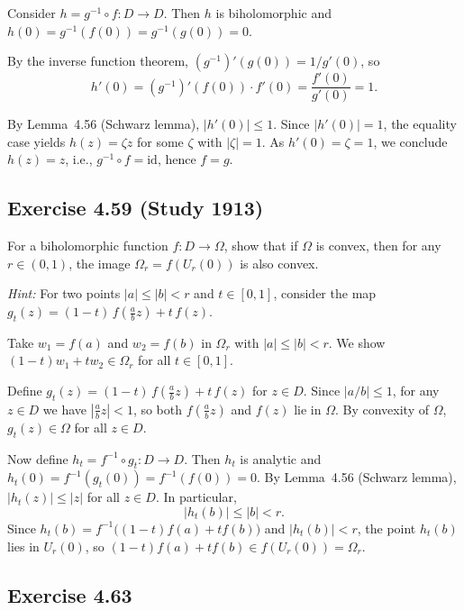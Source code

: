 \documentclass{article}
\begin{document}
\begin{solution}
  Consider $h = g^{-1} \circ f : D \to D$. Then $h$ is biholomorphic
  and $h(0) = g^{-1}(f(0)) = g^{-1}(g(0)) = 0$.

  By the inverse function theorem, $(g^{-1})'(g(0)) = 1/g'(0)$, so
  \[
    h'(0) = (g^{-1})'(f(0)) \cdot f'(0)
    = \frac{f'(0)}{g'(0)} = 1.
  \]

  By Lemma~4.56 (Schwarz lemma), $|h'(0)| \le 1$. Since
  $|h'(0)| = 1$, the equality case yields $h(z) = \zeta z$ for some
  $\zeta$ with $|\zeta| = 1$. As $h'(0) = \zeta = 1$, we conclude
  $h(z) = z$, i.e., $g^{-1} \circ f = \mathrm{id}$, hence $f = g$.
\end{solution}

\subsection{Exercise 4.59 (Study 1913)}

For a biholomorphic function $f : D \to \Omega$, show that if $\Omega$
is convex, then for any $r \in (0, 1)$, the image
$\Omega_r = f(U_r(0))$ is also convex.

\textit{Hint:} For two points $|a| \le |b| < r$ and $t \in [0, 1]$,
consider the map
$g_t(z) = (1-t)\,f\!\left(\frac{a}{b}z\right) + t\,f(z)$.

\begin{solution}
  Take $w_1 = f(a)$ and $w_2 = f(b)$ in $\Omega_r$ with
  $|a| \le |b| < r$. We show $(1-t)w_1 + tw_2 \in \Omega_r$ for all
  $t \in [0,1]$.

  Define
  $g_t(z) = (1-t)\,f\!\left(\tfrac{a}{b}z\right) + t\,f(z)$
  for $z \in D$. Since $|a/b| \le 1$, for any $z \in D$ we have
  $|\tfrac{a}{b}z| < 1$, so both $f(\tfrac{a}{b}z)$ and $f(z)$ lie
  in $\Omega$. By convexity of $\Omega$, $g_t(z) \in \Omega$ for all
  $z \in D$.

  Now define $h_t = f^{-1} \circ g_t : D \to D$. Then $h_t$ is
  analytic and
  $h_t(0) = f^{-1}(g_t(0)) = f^{-1}(f(0)) = 0$.
  By Lemma~4.56 (Schwarz lemma),
  $|h_t(z)| \le |z|$ for all $z \in D$.
  In particular,
  \[
    |h_t(b)| \le |b| < r.
  \]
  Since
  $h_t(b) = f^{-1}\!\bigl((1-t)f(a) + tf(b)\bigr)$
  and $|h_t(b)| < r$, the point $h_t(b)$ lies in $U_r(0)$, so
  $(1-t)f(a) + tf(b) \in f(U_r(0)) = \Omega_r$.
\end{solution}

\subsection{Exercise 4.63}
\end{document}
